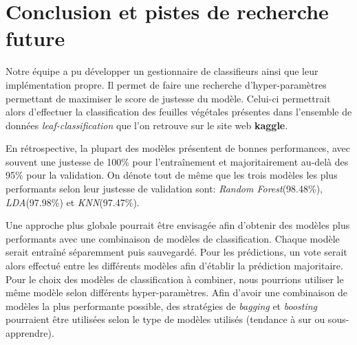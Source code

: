 \section{Conclusion et pistes de recherche future}
Notre équipe a pu développer un gestionnaire de classifieurs ainsi que leur implémentation propre. Il permet de faire une recherche d'hyper-paramètres permettant de maximiser le score de justesse du modèle. 
Celui-ci permettrait alors d'effectuer la classification des feuilles végétales présentes dans l'ensemble de données \emph{leaf-classification} que l'on retrouve sur le site web \textbf{kaggle}.

En rétrospective, la plupart des modèles présentent de bonnes performances, avec souvent une justesse de 100\% pour l'entraînement et majoritairement au-delà des 95\% pour la validation. On dénote tout de même que les trois modèles les plus performants selon leur justesse de validation sont: \emph{Random Forest}(98.48\%), \emph{LDA}(97.98\%) et \emph{KNN}(97.47\%).\linebreak 

Une approche plus globale pourrait être envisagée afin d'obtenir des modèles plus performants avec une combinaison de modèles de classification. Chaque modèle serait entraîné séparemment puis sauvegardé. Pour les prédictions, un vote serait alors effectué entre les différents modèles afin d'établir la prédiction majoritaire. 
Pour le choix des modèles de classification à combiner, nous pourrions utiliser le même modèle selon différents hyper-paramètres. 
Afin d'avoir une combinaison de modèles la plus performante possible, des stratégies de \emph{bagging} et \emph{boosting} pourraient être utilisées selon le type de modèles utilisés (tendance à sur ou sous-apprendre).